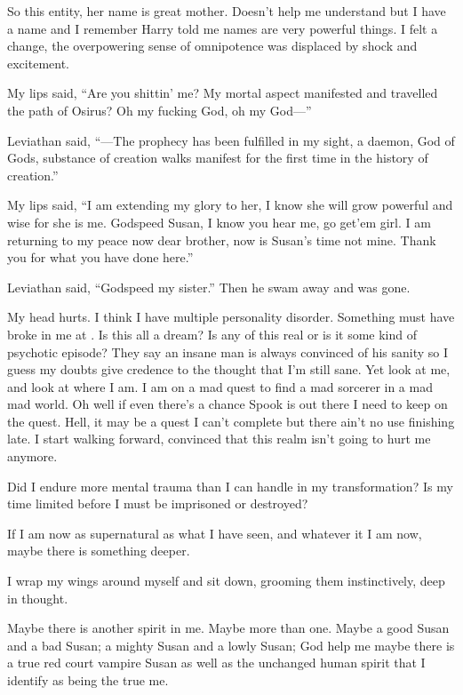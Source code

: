So this entity, her name is great mother. Doesn't help me understand but I have a name and I remember Harry told me names are very powerful things. I felt a change, the overpowering sense of omnipotence was displaced by shock and excitement.

My lips said, ``Are you shittin' me? My mortal aspect manifested and travelled the path of Osirus? Oh my fucking God, oh my God---''

Leviathan said, ``---The prophecy has been fulfilled in my sight, a daemon, God of Gods, substance of creation walks manifest for the first time in the history of creation.''

My lips said, ``I am extending my glory to her, I know she will grow powerful and wise for she is me. Godspeed Susan, I know you hear me, go get'em girl. I am returning to my peace now dear brother, now is Susan's time not mine. Thank you for what you have done here.''

Leviathan said, ``Godspeed my sister.'' Then he swam away and was gone.

\parasep

My head hurts. I think I have multiple personality disorder. Something must have broke in me at \chichenitza*. Is this all a dream? Is any of this real or is it some kind of psychotic episode? They say an insane man is always convinced of his sanity so I guess my doubts give credence to the thought that I'm still sane. Yet look at me, and look at where I am. I am on a mad quest to find a mad sorcerer in a mad mad world. Oh well if even there's a chance Spook is out there I need to keep on the quest. Hell, it may be a quest I can't complete but there ain't no use finishing late. I start walking forward, convinced that this realm isn't going to hurt me anymore.

Did I endure more mental trauma than I can handle in my transformation? Is my time limited before I must be imprisoned or destroyed?

If I am now as supernatural as what I have seen, and whatever it I am now, maybe there is something deeper. 

I wrap my wings around myself and sit down, grooming them instinctively, deep in thought.

Maybe there is another spirit in me. Maybe more than one. Maybe a good Susan and a bad Susan; a mighty Susan and a lowly Susan; God help me maybe there is a true red court vampire Susan as well as the unchanged human spirit that I identify as being the true me.

